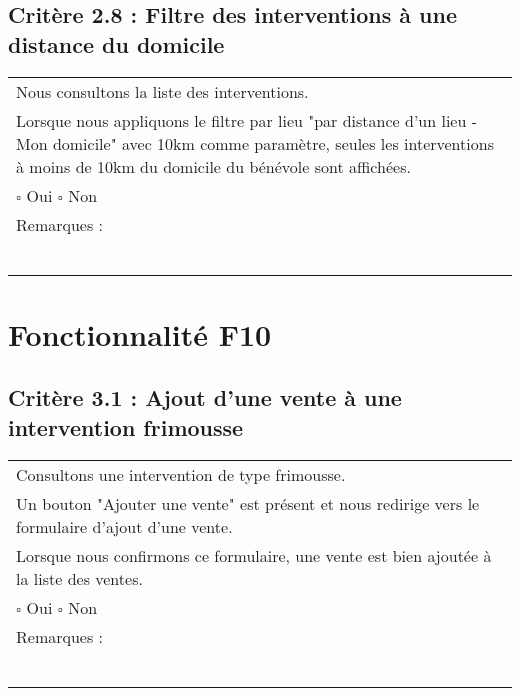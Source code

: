   	\subsection*{Critère 2.8 : Filtre des interventions à une distance du domicile}
  		\begin{center}
    	 		\begin{tabular}[h]{|p{}|}
			\hline
				Nous consultons la liste des interventions. \\
				Lorsque nous appliquons le filtre par lieu "par distance d'un lieu - Mon domicile" avec 10km comme paramètre, seules les interventions à moins de 10km du domicile du bénévole sont affichées. \\
						
				$\square$ Oui  \hfill \hfill $\square$ Non \\\hline Remarques : \\ ~\\
			 \\\hline
     		\end{tabular}
  		\end{center}	
  		
  		
\section{Fonctionnalité F10}
\subsection*{Critère 3.1 : Ajout d'une vente à une intervention frimousse }
  		\begin{center}
    	 		\begin{tabular}[h]{|p{}|}
			\hline
				Consultons une intervention de type frimousse. \\
				Un bouton "Ajouter une vente" est présent et nous redirige vers le formulaire d'ajout d'une vente. \\
				Lorsque nous confirmons ce formulaire, une vente est bien ajoutée à la liste des ventes. \\
				
				$\square$ Oui  \hfill \hfill $\square$ Non \\\hline Remarques : \\ ~\\
			 \\\hline
     		\end{tabular}
  		\end{center}	

